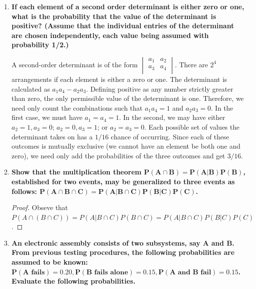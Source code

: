 \documentclass[10pt, oneside]{article}
\begin{document}
\begin{enumerate}[label=3.\arabic*]
\item  \begin{tcolorbox}[
  colback=Cerulean!5!white,
  colframe=Cerulean!75!black]
\textbf{If each element of a second order determinant is either zero or one, what is the probability that the value of the determinant is positive? (Assume that the individual entries of the determinant are chosen independently, each value being assumed with probability 1/2.)}
\end{tcolorbox}

A second-order determinant is of the form $   \begin{vmatrix} %
      a_1 & a_2 \\
      a_3 & a_4 \\
   \end{vmatrix}$. There are $2^4$ arrangements if each element is either a zero or one. The determinant is calculated as $a_1 a_4 - a_2 a_3$. Defining positive as any number strictly greater than zero, the only permissible value of the determinant is one. Therefore, we need only count the combinations such that $a_1 a_4 = 1$ and $a_2 a_3 = 0$. In the first case, we must have $a_1 = a_4 = 1$. In the second, we may have either $a_2 = 1, a_3 = 0$; $a_2 = 0, a_3 = 1$; or $a_2 = a_3 = 0$. Each possible set of values the determinant takes on has a $1/16$ chance of occurring. Since each of these outcomes is mutually exclusive (we cannot have an element be both one and zero), we need only add the probabilities of the three outcomes and get $\boxed{3/16}$.
   
\item  \begin{tcolorbox}[
  colback=Cerulean!5!white,
  colframe=Cerulean!75!black]
\textbf{Show that the multiplication theorem $\bm{P(A \cap B) = P(A | B) P(B)}$, established for two events, may be generalized to three events as follows: $\bm{P(A \cap B \cap C) = P(A | B \cap C) P(B | C) P(C)}$.}
\end{tcolorbox}

\begin{proof} Obseve that $P(A \cap (B \cap C)) = P(A | B \cap C) P(B \cap C) = P(A | B \cap C) P(B | C) P(C)$.
\end{proof}

\item  \begin{tcolorbox}[
  colback=Cerulean!5!white,
  colframe=Cerulean!75!black]
\textbf{An electronic assembly consists of two subsystems, say $\bm{A}$ and $\bm{B}$. From previous testing procedures, the following probabilities are assumed to be known: $\bm{P(A \text{ fails}) = 0.20, P(B \text{ fails alone}) = 0.15, P(A \text{ and } B \text{ fail}) = 0.15}$. Evaluate the following probabilities.}
\end{tcolorbox}


\end{enumerate}
\end{document}
